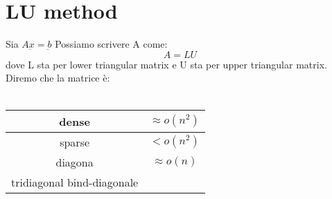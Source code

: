 \section{LU method}
Sia $A\underbar{x}=\underbar{b}$ Possiamo scrivere A come:
\[A=LU\]
dove L sta per lower triangular matrix e U sta per upper triangular matrix.
Diremo che la matrice è:
\\
\\
\begin{tabular}{|c|c|}
\hline
dense & $\approx o(n^2)$ \\
\hline
sparse & $<o(n^2)$ \\
\hline
diagona & $\approx o(n)$ \\
\hline
tridiagonal bind-diagonale& \\ 
\hline 
\end{tabular}
\vspace{0.2cm}

